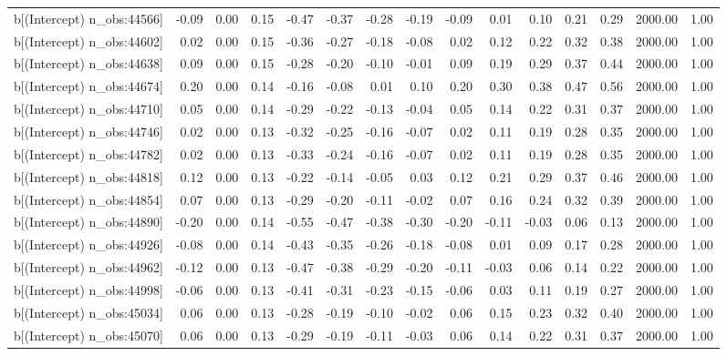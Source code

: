\begin{table}[ht]
\begin{tabular}{rrrrrrrrrrrrrrr}
  b[(Intercept) n\_obs:44566] & -0.09 & 0.00 & 0.15 & -0.47 & -0.37 & -0.28 & -0.19 & -0.09 & 0.01 & 0.10 & 0.21 & 0.29 & 2000.00 & 1.00 \\ 
  b[(Intercept) n\_obs:44602] & 0.02 & 0.00 & 0.15 & -0.36 & -0.27 & -0.18 & -0.08 & 0.02 & 0.12 & 0.22 & 0.32 & 0.38 & 2000.00 & 1.00 \\ 
  b[(Intercept) n\_obs:44638] & 0.09 & 0.00 & 0.15 & -0.28 & -0.20 & -0.10 & -0.01 & 0.09 & 0.19 & 0.29 & 0.37 & 0.44 & 2000.00 & 1.00 \\ 
  b[(Intercept) n\_obs:44674] & 0.20 & 0.00 & 0.14 & -0.16 & -0.08 & 0.01 & 0.10 & 0.20 & 0.30 & 0.38 & 0.47 & 0.56 & 2000.00 & 1.00 \\ 
  b[(Intercept) n\_obs:44710] & 0.05 & 0.00 & 0.14 & -0.29 & -0.22 & -0.13 & -0.04 & 0.05 & 0.14 & 0.22 & 0.31 & 0.37 & 2000.00 & 1.00 \\ 
  b[(Intercept) n\_obs:44746] & 0.02 & 0.00 & 0.13 & -0.32 & -0.25 & -0.16 & -0.07 & 0.02 & 0.11 & 0.19 & 0.28 & 0.35 & 2000.00 & 1.00 \\ 
  b[(Intercept) n\_obs:44782] & 0.02 & 0.00 & 0.13 & -0.33 & -0.24 & -0.16 & -0.07 & 0.02 & 0.11 & 0.19 & 0.28 & 0.35 & 2000.00 & 1.00 \\ 
  b[(Intercept) n\_obs:44818] & 0.12 & 0.00 & 0.13 & -0.22 & -0.14 & -0.05 & 0.03 & 0.12 & 0.21 & 0.29 & 0.37 & 0.46 & 2000.00 & 1.00 \\ 
  b[(Intercept) n\_obs:44854] & 0.07 & 0.00 & 0.13 & -0.29 & -0.20 & -0.11 & -0.02 & 0.07 & 0.16 & 0.24 & 0.32 & 0.39 & 2000.00 & 1.00 \\ 
  b[(Intercept) n\_obs:44890] & -0.20 & 0.00 & 0.14 & -0.55 & -0.47 & -0.38 & -0.30 & -0.20 & -0.11 & -0.03 & 0.06 & 0.13 & 2000.00 & 1.00 \\ 
  b[(Intercept) n\_obs:44926] & -0.08 & 0.00 & 0.14 & -0.43 & -0.35 & -0.26 & -0.18 & -0.08 & 0.01 & 0.09 & 0.17 & 0.28 & 2000.00 & 1.00 \\ 
  b[(Intercept) n\_obs:44962] & -0.12 & 0.00 & 0.13 & -0.47 & -0.38 & -0.29 & -0.20 & -0.11 & -0.03 & 0.06 & 0.14 & 0.22 & 2000.00 & 1.00 \\ 
  b[(Intercept) n\_obs:44998] & -0.06 & 0.00 & 0.13 & -0.41 & -0.31 & -0.23 & -0.15 & -0.06 & 0.03 & 0.11 & 0.19 & 0.27 & 2000.00 & 1.00 \\ 
  b[(Intercept) n\_obs:45034] & 0.06 & 0.00 & 0.13 & -0.28 & -0.19 & -0.10 & -0.02 & 0.06 & 0.15 & 0.23 & 0.32 & 0.40 & 2000.00 & 1.00 \\ 
  b[(Intercept) n\_obs:45070] & 0.06 & 0.00 & 0.13 & -0.29 & -0.19 & -0.11 & -0.03 & 0.06 & 0.14 & 0.22 & 0.31 & 0.37 & 2000.00 & 1.00 \\ 

\end{tabular}
\end{table}
